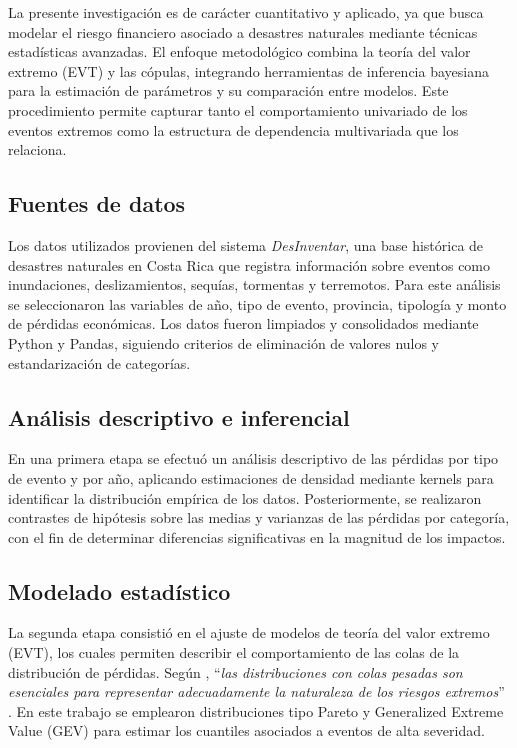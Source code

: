 \documentclass[12pt, a4paper]{article}
\begin{document}
La presente investigación es de carácter cuantitativo y aplicado, ya que busca modelar el riesgo financiero asociado a desastres naturales mediante técnicas estadísticas avanzadas. El enfoque metodológico combina la teoría del valor extremo (EVT) y las cópulas, integrando herramientas de inferencia bayesiana para la estimación de parámetros y su comparación entre modelos. Este procedimiento permite capturar tanto el comportamiento univariado de los eventos extremos como la estructura de dependencia multivariada que los relaciona.

\subsection*{Fuentes de datos}
Los datos utilizados provienen del sistema \textit{DesInventar}, una base histórica de desastres naturales en Costa Rica que registra información sobre eventos como inundaciones, deslizamientos, sequías, tormentas y terremotos. Para este análisis se seleccionaron las variables de año, tipo de evento, provincia, tipología y monto de pérdidas económicas. Los datos fueron limpiados y consolidados mediante Python y Pandas, siguiendo criterios de eliminación de valores nulos y estandarización de categorías.

\subsection*{Análisis descriptivo e inferencial}
En una primera etapa se efectuó un análisis descriptivo de las pérdidas por tipo de evento y por año, aplicando estimaciones de densidad mediante kernels para identificar la distribución empírica de los datos. Posteriormente, se realizaron contrastes de hipótesis sobre las medias y varianzas de las pérdidas por categoría, con el fin de determinar diferencias significativas en la magnitud de los impactos.

\subsection*{Modelado estadístico}
La segunda etapa consistió en el ajuste de modelos de teoría del valor extremo (EVT), los cuales permiten describir el comportamiento de las colas de la distribución de pérdidas. Según , “\textit{las distribuciones con colas pesadas son esenciales para representar adecuadamente la naturaleza de los riesgos extremos}” \cite[p. 260]{Klugman2019}. En este trabajo se emplearon distribuciones tipo Pareto y Generalized Extreme Value (GEV) para estimar los cuantiles asociados a eventos de alta severidad.
\end{document}

